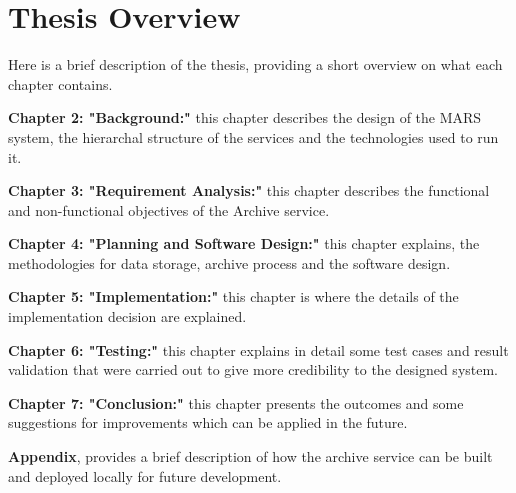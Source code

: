     \section{Thesis Overview} 
        Here is a brief description of the thesis, providing a short overview on what each
        chapter contains.
        
        \par
        \textbf{Chapter 2: "Background:"} this chapter describes the design
        of the MARS system, the hierarchal structure of the services and the technologies used to
        run it.

        \par
        \textbf{Chapter 3: "Requirement Analysis:"} this chapter describes the functional and
        non-functional objectives of the Archive service.

        \par
        \textbf{Chapter 4: "Planning and Software Design:"} this chapter explains, the 
        methodologies for data storage, archive process and the software design.

        \par
        \textbf{Chapter 5: "Implementation:"} this chapter is where the details of the 
        implementation decision are explained.

        \par
        \textbf{Chapter 6: "Testing:"} this chapter explains in detail 
        some test cases and result validation that were carried out to give more credibility to the designed system.

        \par
        \textbf{Chapter 7: "Conclusion:"} this chapter presents the outcomes and some 
        suggestions for improvements which can be applied in the future.
        
        \textbf{Appendix}, provides a brief description of how the archive service can be built and deployed locally for future development.

